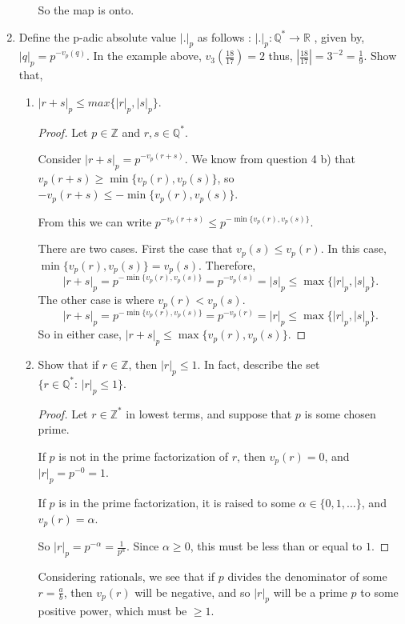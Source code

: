 \documentclass{article}
\begin{document}
\begin{enumerate}
\begin{enumerate}[label= (\alph*)]
        So the map is onto.
\end{enumerate}
\item Define the p-adic absolute value $|.|_p$ as follows : $|.|_p : \mathbb{Q}^{*} \to \mathbb{R}$
    , given by, $|q|_p = p^{-v_p(q)}$.
In the example above, $v_3(\frac{18}{17})=2$ thus, $\left| \frac{18}{17} \right| =3^{-2}=\frac{1}{9}$.
Show that,
\begin{enumerate}[label= (\alph*)] 
\item $|r + s|_p \le  max\{|r|_p, |s|_p\}.$
    \begin{proof} 
        Let $p\in \mathbb{Z}$ and $r,s\in \mathbb{Q}^{*}$.

        Consider $\left| r+s \right| _p =p^{-v_p(r+s)}$. We know from question 4 b) that 
        $v_p(r + s) \ge \min\{v_p(r), v_p(s)\}$, so $-v_p(r + s) \le -\min\{v_p(r), v_p(s)\}$.

        From this we can write $p^{-v_p(r+s)}\leq p^{-\min \{v_p(r),v_p(s)\} }$.

        There are two cases. First the case that $v_p(s)\leq v_p(r)$. In this case, 
        $\min \{v_p(r),v_p(s)\}=v_p(s)$. Therefore,
        \[
            |r+s|_p=p^{-\min \{v_p(r),v_p(s)\}}=p^{-v_p(s)}=|s|_p\leq \max \{|r|_p,|s|_p\} 
        .\] 
        The other case is where $v_p(r)<v_p(s)$.
        \[
            |r+s|_p=p^{-\min \{v_p(r),v_p(s)\}}=p^{-v_p(r)}=|r|_p\leq \max \{|r|_p,|s|_p\} 
        .\] 
        So in either case, $|r+s|_p\leq \max \{v_p(r),v_p(s)\}$.
    \end{proof}
\item Show that if $r \in  \mathbb{Z}$, then $|r|_p \le 1$. In fact, describe the set 
    $\{r\in \mathbb{Q}^{*}: \, |r|_p \le 1\} $.

    \begin{proof} 
        Let $r\in \mathbb{Z}^{*}$ in lowest terms, and suppose that $p$ is some chosen prime.

        If $p$ is not in the prime factorization of $r$, then $v_p(r)=0$, and 
        $\left| r \right|_p=p^{-0}=1$.

        If $p$ is in the prime factorization, it is raised to some $\alpha\in \{0,1,\ldots\} $, and
        $v_p(r)=\alpha$.

        So $\left| r \right| _p=p^{-\alpha}=\frac{1}{p^\alpha}$. Since $\alpha\ge 0$, this must be 
        less than or equal to $1$.
    \end{proof}

    Considering rationals, we see that if $p$ divides the denominator of some $r=\frac{a}{b}$, then
$v_p(r)$ will be negative, and so $|r|_p$ will be a prime $p$ to some positive power, which must be
$\geq 1$.
\end{enumerate}
\end{enumerate}
\end{document}
